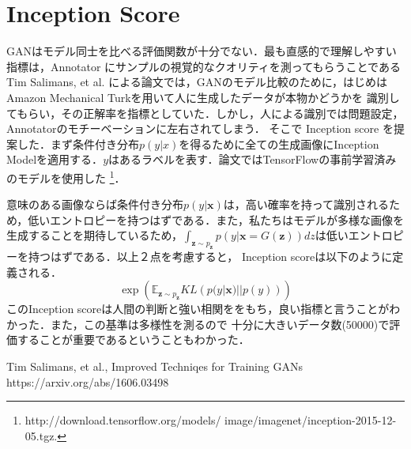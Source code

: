 \documentclass[uplatex, dvipdfmx]{jsarticle}
\theoremstyle{definition}
\begin{document}
    \section{Inception Score}
    GANはモデル同士を比べる評価関数が十分でない．最も直感的で理解しやすい指標は，Annotator にサンプルの視覚的なクオリティを測ってもらうことである
    Tim Salimans, et al. による論文\cite{salimans}では，GANのモデル比較のために，はじめはAmazon Mechanical Turkを用いて人に生成したデータが本物かどうかを
    識別してもらい，その正解率を指標としていた．しかし，人による識別では問題設定，Annotatorのモチーベーションに左右されてしまう．
    そこで Inception score を提案した．まず条件付き分布$p(y|x)$を得るために全ての生成画像にInception Modelを適用する．$y$はあるラベルを表す．論文ではTensorFlowの事前学習済みのモデルを使用した
    \footnote{http://download.tensorflow.org/models/
    image/imagenet/inception-2015-12-05.tgz.}．

    意味のある画像ならば条件付き分布$p(y | \bm{x})$は，高い確率を持って識別されるため，低いエントロピーを持つはずである．また，私たちはモデルが多様な画像を
    生成することを期待しているため，$\int_{\bm{z} \sim p_{\bm{z}}} p(y | \bm{x} = G(\bm{z})) dz$は低いエントロピーを持つはずである．以上２点を考慮すると，
    Inception scoreは以下のように定義される．
    \begin{equation}
        \exp\left(\mathbb{E}_{\bm{z} \sim p_{\bm{z}}} KL\left( p(y | \bm{x}) || p(y) \right) \right)
    \end{equation}
    このInception scoreは人間の判断と強い相関ををもち，良い指標と言うことがわかった．また，この基準は多様性を測るので
    十分に大きいデータ数(50000)で評価することが重要であるということもわかった．
    \newpage
    \begin{thebibliography}{10}
            Tim Salimans, et al., Improved Techniqes for Training GANs \\
            https://arxiv.org/abs/1606.03498
    \end{thebibliography}
    
\end{document}
